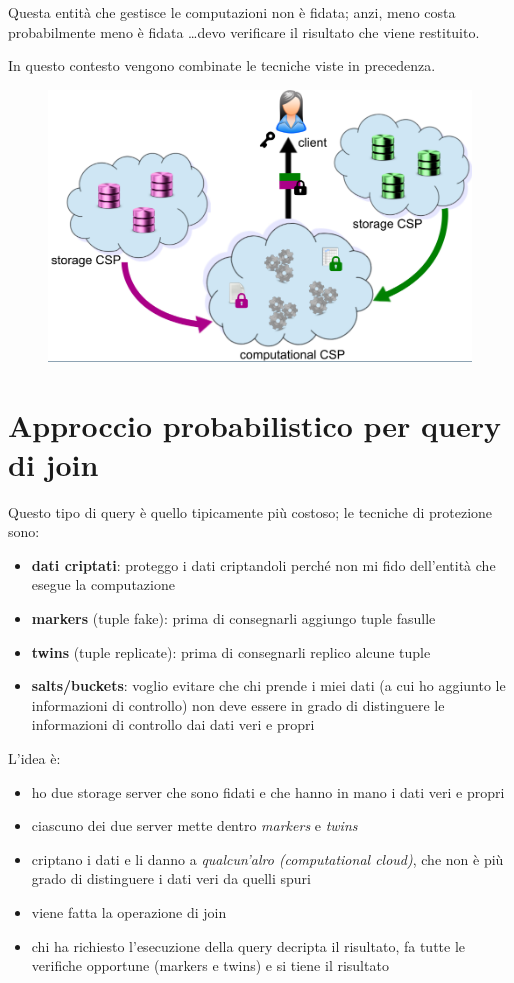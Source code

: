 \documentclass{report}
\begin{document}
\noindent Questa entità che gestisce le computazioni non è fidata; anzi, meno costa probabilmente 
meno è fidata \dots devo verificare il risultato che viene restituito.

\noindent In questo contesto vengono combinate le tecniche viste in precedenza.

\begin{figure}[H]
    \centering
    \includegraphics[width=0.8\linewidth]{images/scenario.png}
\end{figure}

\section{Approccio probabilistico per query di join}
Questo tipo di query è quello tipicamente più costoso; le tecniche di protezione 
sono:
\begin{itemize}
    \item \textbf{dati criptati}: proteggo i dati criptandoli perché non mi fido dell'entità che esegue la computazione
    \item \textbf{markers} (tuple fake): prima di consegnarli aggiungo tuple fasulle
    \item \textbf{twins} (tuple replicate): prima di consegnarli replico alcune tuple
    \item \textbf{salts/buckets}: voglio evitare che chi prende i miei dati (a cui ho aggiunto le informazioni di controllo)
    non deve essere in grado di distinguere le informazioni di controllo dai dati veri e propri
\end{itemize}


\noindent L'idea è:
\begin{itemize}
    \item ho due storage server che sono fidati e che hanno in mano i dati veri e propri
    \item ciascuno dei due server mette dentro \textit{markers} e \textit{twins}
    \item criptano i dati e li danno a \textit{qualcun'alro (computational cloud)}, che non è più 
    grado di distinguere i dati veri da quelli spuri
    \item viene fatta la operazione di join 
    \item chi ha richiesto l'esecuzione della query decripta il risultato, fa tutte le verifiche opportune 
    (markers e twins) e si tiene il risultato
\end{itemize}
\end{document}
